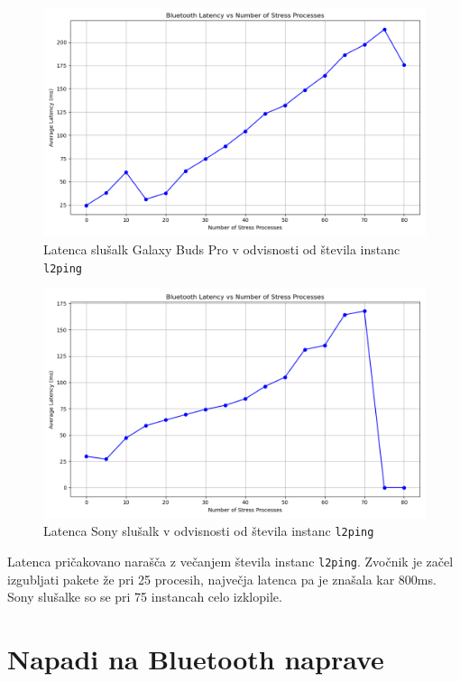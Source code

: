 \documentclass[11pt,a4paper,slovene]{article}
\begin{document}
\begin{figure}[H]
    \centering
    \includegraphics[width=1\textwidth]{images/buds_stress_latency_80.png}
    \caption{Latenca slušalk Galaxy Buds Pro v odvisnosti od števila instanc \texttt{l2ping}}
    \label{fig:buds_stress_latency}
\end{figure}

\begin{figure}[H]
    \centering
    \includegraphics[width=1\textwidth]{images/sony_stress_latency_80.png}
    \caption{Latenca Sony slušalk v odvisnosti od števila instanc \texttt{l2ping}}
    \label{fig:sony_stress_latency}
\end{figure}

Latenca pričakovano narašča z večanjem števila instanc \texttt{l2ping}. Zvočnik je začel izgubljati pakete že pri 25 procesih, največja latenca pa je znašala kar 800ms. Sony slušalke so se pri 75 instancah celo izklopile.

\section{Napadi na Bluetooth naprave}
\end{document}
